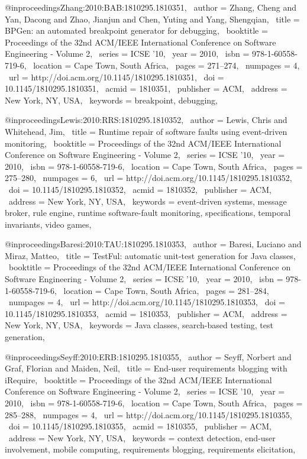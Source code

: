 @inproceedings{Zhang:2010:BAB:1810295.1810351,
 author = {Zhang, Cheng and Yan, Dacong and Zhao, Jianjun and Chen, Yuting and Yang, Shengqian},
 title = {BPGen: an automated breakpoint generator for debugging},
 booktitle = {Proceedings of the 32nd ACM/IEEE International Conference on Software Engineering - Volume 2},
 series = {ICSE '10},
 year = {2010},
 isbn = {978-1-60558-719-6},
 location = {Cape Town, South Africa},
 pages = {271--274},
 numpages = {4},
 url = {http://doi.acm.org/10.1145/1810295.1810351},
 doi = {10.1145/1810295.1810351},
 acmid = {1810351},
 publisher = {ACM},
 address = {New York, NY, USA},
 keywords = {breakpoint, debugging},
} 

@inproceedings{Lewis:2010:RRS:1810295.1810352,
 author = {Lewis, Chris and Whitehead, Jim},
 title = {Runtime repair of software faults using event-driven monitoring},
 booktitle = {Proceedings of the 32nd ACM/IEEE International Conference on Software Engineering - Volume 2},
 series = {ICSE '10},
 year = {2010},
 isbn = {978-1-60558-719-6},
 location = {Cape Town, South Africa},
 pages = {275--280},
 numpages = {6},
 url = {http://doi.acm.org/10.1145/1810295.1810352},
 doi = {10.1145/1810295.1810352},
 acmid = {1810352},
 publisher = {ACM},
 address = {New York, NY, USA},
 keywords = {event-driven systems, message broker, rule engine, runtime software-fault monitoring, specifications, temporal invariants, video games},
} 

@inproceedings{Baresi:2010:TAU:1810295.1810353,
 author = {Baresi, Luciano and Miraz, Matteo},
 title = {TestFul: automatic unit-test generation for Java classes},
 booktitle = {Proceedings of the 32nd ACM/IEEE International Conference on Software Engineering - Volume 2},
 series = {ICSE '10},
 year = {2010},
 isbn = {978-1-60558-719-6},
 location = {Cape Town, South Africa},
 pages = {281--284},
 numpages = {4},
 url = {http://doi.acm.org/10.1145/1810295.1810353},
 doi = {10.1145/1810295.1810353},
 acmid = {1810353},
 publisher = {ACM},
 address = {New York, NY, USA},
 keywords = {Java classes, search-based testing, test generation},
} 

@inproceedings{Seyff:2010:ERB:1810295.1810355,
 author = {Seyff, Norbert and Graf, Florian and Maiden, Neil},
 title = {End-user requirements blogging with iRequire},
 booktitle = {Proceedings of the 32nd ACM/IEEE International Conference on Software Engineering - Volume 2},
 series = {ICSE '10},
 year = {2010},
 isbn = {978-1-60558-719-6},
 location = {Cape Town, South Africa},
 pages = {285--288},
 numpages = {4},
 url = {http://doi.acm.org/10.1145/1810295.1810355},
 doi = {10.1145/1810295.1810355},
 acmid = {1810355},
 publisher = {ACM},
 address = {New York, NY, USA},
 keywords = {context detection, end-user involvement, mobile computing, requirements blogging, requirements elicitation},
} 

